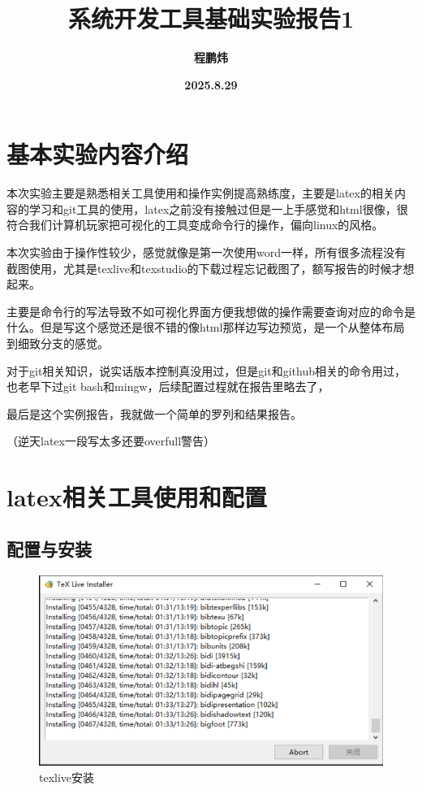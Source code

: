 \documentclass{article}
\begin{document}
	\title{\textbf{系统开发工具基础实验报告1}}
	\author{\textbf{程鹏炜}}
	\date{\textbf{2025.8.29}}
	\maketitle
	
	\tableofcontents
	\newpage
	
	\section{基本实验内容介绍}
	本次实验主要是熟悉相关工具使用和操作实例提高熟练度，主要是latex的相关内容的学习和git工具的使用，latex之前没有接触过但是一上手感觉和html很像，很符合我们计算机玩家把可视化的工具变成命令行的操作，偏向linux的风格。
	
	本次实验由于操作性较少，感觉就像是第一次使用word一样，所有很多流程没有截图使用，尤其是texlive和texstudio的下载过程忘记截图了，额写报告的时候才想起来。
	
	主要是命令行的写法导致不如可视化界面方便我想做的操作需要查询对应的命令是什么。但是写这个感觉还是很不错的像html那样边写边预览，是一个从整体布局到细致分支的感觉。
	
	对于git相关知识，说实话版本控制真没用过，但是git和github相关的命令用过，也老早下过git bash和mingw，后续配置过程就在报告里略去了，
	
	最后是这个实例报告，我就做一个简单的罗列和结果报告。
	
	（逆天latex一段写太多还要overfull警告）
	\newpage
	\section{latex相关工具使用和配置}
	\subsection{配置与安装}
	\begin{figure}[h]  
		\centering
		\includegraphics[width=1\textwidth]{a.png}
		\caption{texlive安装}
		\label{fig:example1}
	\end{figure}
\end{document}
